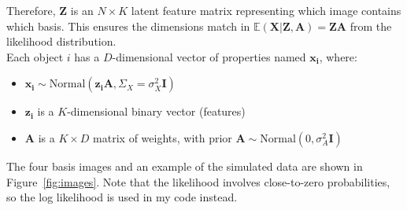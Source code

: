 Therefore, $\mathbf{Z}$ is an $N \times K$ latent feature matrix representing which image contains which basis. This ensures the dimensions match in $\mathbb{E}(\mathbf{X}|\mathbf{Z,A}) = \mathbf{Z A}$ from the likelihood distribution.\\

Each object $i$ has a $D$-dimensional vector of properties named $\mathbf{x_i}$, where:
\begin{itemize}
\item $\mathbf{x_i} \sim \text{Normal}(\mathbf{z_i} \mathbf{A}, \Sigma_X = \sigma_X^2\mathbf{I})$
\item $\mathbf{z_i}$ is a $K$-dimensional binary vector (features)
\item $\mathbf{A}$ is a $K \times D$ matrix of weights, with prior $\mathbf{A} \sim \text{Normal}(0,\sigma_A^2 \mathbf{I})$
\end{itemize}

The four basis images and an example of the simulated data are shown in Figure~\ref{fig:images}. Note that the likelihood involves close-to-zero probabilities, so the log likelihood is used in my code instead.

